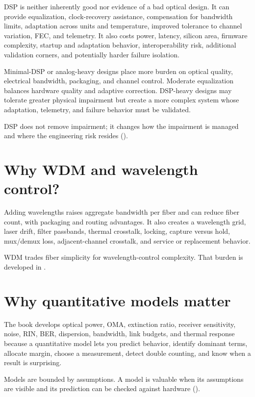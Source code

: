 DSP is neither inherently good nor evidence of a bad optical design. It can
provide equalization, clock-recovery assistance, compensation for bandwidth
limits, adaptation across units and temperature, improved tolerance to channel
variation, FEC, and telemetry. It also costs power, latency, silicon area,
firmware complexity, startup and adaptation behavior, interoperability risk,
additional validation corners, and potentially harder failure isolation.

Minimal-DSP or analog-heavy designs place more burden on optical quality,
electrical bandwidth, packaging, and channel control. Moderate equalization
balances hardware quality and adaptive correction. DSP-heavy designs may
tolerate greater physical impairment but create a more complex system whose
adaptation, telemetry, and failure behavior must be validated.

DSP does not remove impairment; it changes how the impairment is managed and
where the engineering risk resides ().

\section{Why WDM and wavelength control?}

Adding wavelengths raises aggregate bandwidth per fiber and can reduce fiber
count, with packaging and routing advantages. It also creates a wavelength grid,
laser drift, filter passbands, thermal crosstalk, locking, capture versus hold,
mux/demux loss, adjacent-channel crosstalk, and service or replacement
behavior.

WDM trades fiber simplicity for wavelength-control complexity. That burden is
developed in .

\section{Why quantitative models matter}

The book develops optical power, OMA, extinction ratio, receiver sensitivity,
noise, RIN, BER, dispersion, bandwidth, link budgets, and thermal response
because a quantitative model lets you predict behavior, identify dominant terms,
allocate margin, choose a measurement, detect double counting, and know when a
result is surprising.

Models are bounded by assumptions. A model is valuable when its assumptions are
visible and its prediction can be checked against hardware
().

